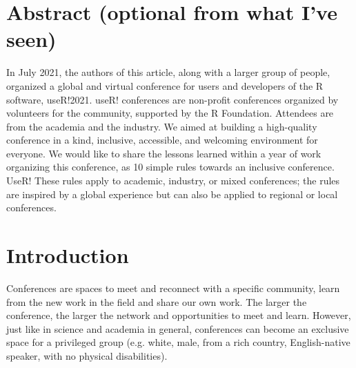 \documentclass[10pt,letterpaper]{article}
\begin{document}
\section*{Abstract (optional from what I've seen)}

In July 2021, the authors of this article, along with a larger group of people, organized a global and virtual conference for users and developers of the R software, useR!2021. useR! conferences are non-profit conferences organized by volunteers for the community, supported by the R Foundation. Attendees are from the academia and the industry. We aimed at building a high-quality conference in a kind, inclusive, accessible, and welcoming environment for everyone. We would like to share the lessons learned within a year of work organizing this conference, as 10 simple rules towards an inclusive conference. UseR! These rules apply to academic, industry, or mixed conferences; the rules are inspired by a global experience but can also be applied to regional or local conferences. 



\linenumbers

\section*{Introduction}

Conferences are spaces to meet and reconnect with a specific community, learn from the new work in the field and share our own work. The larger the conference, the larger the network and opportunities to meet and learn. However, just like in science and academia in general, conferences can become an exclusive space for a privileged group (e.g. white, male, from a rich country, English-native speaker, with no physical disabilities).
\end{document}
